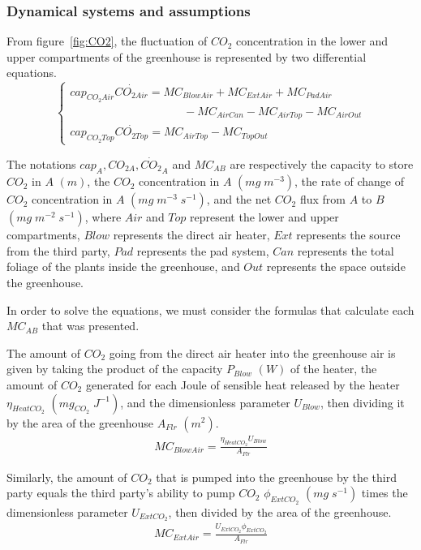 \documentclass[a4paper]{article}
\begin{document}
\subsubsection{Dynamical systems and assumptions}
From figure~\ref{fig:CO2}, the fluctuation of \(CO_2\) concentration in the lower and upper compartments of the greenhouse is represented by two differential equations.
\begin{equation}
  \begin{cases}
    cap_{CO_2 Air}\dot{CO_{2 Air}} = MC_{BlowAir} + MC_{ExtAir} + MC_{PadAir} \\ \qquad \qquad \qquad \qquad \qquad
    - MC_{AirCan} - MC_{AirTop} - MC_{AirOut}                                 \\
    cap_{CO_2 Top}\dot{CO_{2 Top}} = MC_{AirTop} - MC_{TopOut}
  \end{cases}
\end{equation}

The notations \(cap_A, CO_{2 A}, \dot{CO_2}_A\) and \(MC_{AB}\) are respectively the capacity to store \(CO_2\) in \(A\) \((m)\), the \(CO_2\) concentration in \(A\) \((mg\;m^{-3})\), the rate of change of \(CO_2\) concentration in \(A\) \((mg\;m^{-3}\;s^{-1})\), and the net \(CO_2\) flux from \(A\) to \(B\) \((mg\;m^{-2}\;s^{-1})\), where \(Air\) and \(Top\) represent the lower and upper compartments, \(Blow\) represents the direct air heater, \(Ext\) represents the source from the third party, \(Pad\) represents the pad system, \(Can\) represents the total foliage of the plants inside the greenhouse, and \(Out\) represents the space outside the greenhouse.

In order to solve the equations, we must consider the formulas that calculate each \(MC_{AB}\) that was presented.

The amount of \(CO_2\) going from the direct air heater into the greenhouse air is given by taking the product of the capacity \(P_{Blow}\) \((W)\) of the heater, the amount of \(CO_2\) generated for each Joule of sensible heat released by the heater \(\eta_{HeatCO_2}\) \((mg_{CO_2}\;J^{-1})\), and the dimensionless parameter \(U_{Blow}\), then dividing it by the area of the greenhouse \(A_{Flr}\) \((m^2)\).
\begin{gather}
  MC_{BlowAir} = \frac{\eta_{HeatCO_2}U_{Blow}}{A_{Flr}}
\end{gather}

Similarly, the amount of \(CO_2\) that is pumped into the greenhouse by the third party equals the third party's ability to pump \(CO_2\) \(\phi_{ExtCO_2}\) \((mg\;s^{-1})\) times the dimensionless parameter \(U_{ExtCO_2}\), then divided by the area of the greenhouse.
\begin{gather}
  MC_{ExtAir} = \frac{U_{ExtCO_2}\phi_{ExtCO_2}}{A_{Flr}}
\end{gather}
\end{document}
